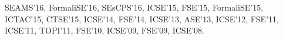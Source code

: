 \item  SEAMS'16, FormaliSE'16, SEsCPS'16, ICSE'15, FSE'15, FormaliSE'15, ICTAC'15, CTSE'15, ICSE'14, FSE'14, ICSE'13, ASE'13, ICSE'12, FSE'11, 
ICSE'11, TOPI'11, FSE'10, ICSE'09, FSE'09, 
ICSE'08.